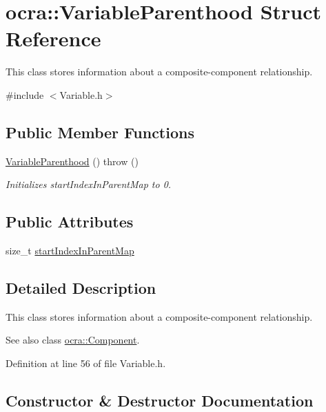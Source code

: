 \hypertarget{structocra_1_1VariableParenthood}{}\section{ocra\+:\+:Variable\+Parenthood Struct Reference}
\label{structocra_1_1VariableParenthood}


This class stores information about a composite-\/component relationship.  




{\ttfamily \#include $<$Variable.\+h$>$}

\subsection*{Public Member Functions}
\begin{DoxyCompactItemize}
\item 
\hyperlink{structocra_1_1VariableParenthood_a5c25166e583bfc9edfc5bf4ddde0cc08}{Variable\+Parenthood} ()  throw ()
\begin{DoxyCompactList}\small\item\em Initializes start\+Index\+In\+Parent\+Map to 0. \end{DoxyCompactList}\end{DoxyCompactItemize}
\subsection*{Public Attributes}
\begin{DoxyCompactItemize}
\item 
size\+\_\+t \hyperlink{structocra_1_1VariableParenthood_a94549ed54ec259fda2c6ba07de66937a}{start\+Index\+In\+Parent\+Map}
\end{DoxyCompactItemize}


\subsection{Detailed Description}
This class stores information about a composite-\/component relationship. 

\begin{DoxySeeAlso}{See also}
class \hyperlink{classocra_1_1Component}{ocra\+::\+Component}. 
\end{DoxySeeAlso}


Definition at line 56 of file Variable.\+h.



\subsection{Constructor \& Destructor Documentation}
\hypertarget{structocra_1_1VariableParenthood_a5c25166e583bfc9edfc5bf4ddde0cc08}{}\label{structocra_1_1VariableParenthood_a5c25166e583bfc9edfc5bf4ddde0cc08} 
